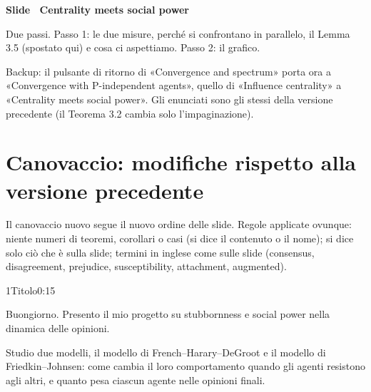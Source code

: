\par\addvspace{14pt}\noindent\begin{minipage}{\textwidth}
{\color{unipd}\bfseries Slide  \textperiodcentered\ Centrality meets social power}\par\smallskip
{\small Due passi. Passo 1: le due misure, perché si confrontano in parallelo, il Lemma 3.5 (spostato qui) e cosa ci aspettiamo. Passo 2: il grafico.}\par\smallskip
\noindent\begin{minipage}[t]{0.36\textwidth}\par
{}\par\smallskip
\end{minipage}\hfill\begin{minipage}[t]{0.61\textwidth}\par
{}\par\smallskip
{}\par\smallskip
\end{minipage}\par
\end{minipage}\par
\par\smallskip\noindent Backup: il pulsante di ritorno di «Convergence and spectrum» porta ora a «Convergence with P-independent agents», quello di «Influence centrality» a «Centrality meets social power». Gli enunciati sono gli stessi della versione precedente (il Teorema 3.2 cambia solo l'impaginazione).\par
\clearpage
\section*{Canovaccio: modifiche rispetto alla versione precedente}
Il canovaccio nuovo segue il nuovo ordine delle slide. Regole applicate ovunque: niente numeri di teoremi, corollari o casi (si dice il contenuto o il nome); si dice solo ciò che è sulla slide; termini in inglese come sulle slide (consensus, disagreement, prejudice, susceptibility, attachment, augmented).
\begin{slidepag}{1}{Titolo}{0:15}
  \begin{discorso}
    \item Buongiorno. Presento il mio progetto su stubbornness e social power nella dinamica delle opinioni.
    \item Studio due modelli, il modello di French–Harary–DeGroot e il modello di Friedkin–Johnsen: come cambia il loro comportamento quando gli agenti resistono agli altri, e quanto pesa ciascun agente nelle opinioni finali.
  \end{discorso}
\end{slidepag}

